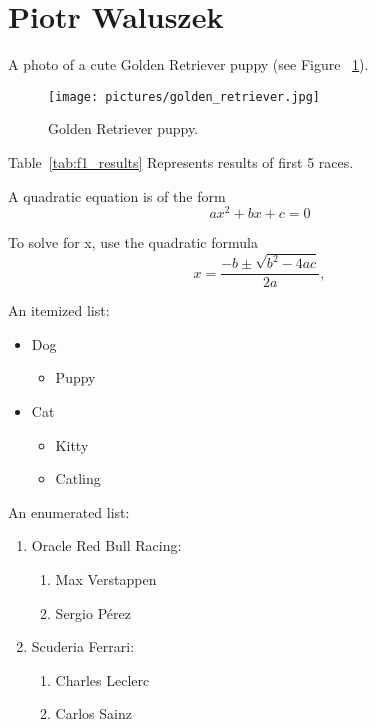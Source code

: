 \section{Piotr Waluszek}
\label{sec:piotrwalu}

A photo of a cute Golden Retriever puppy (see Figure ~\ref{fig:puppy}).

\begin{figure}[htbp]
    \centering
    \texttt{[image: pictures/golden\_retriever.jpg]}
    \caption{Golden Retriever puppy.}
    \label{fig:puppy}
\end{figure}

Table~\ref{tab:f1_results} Represents results of first 5 races.



A quadratic equation is of the form \[ax^2 + bx + c =0 \]

To solve for x, use the quadratic formula $$x = \frac {-b \pm \sqrt{b^2 -4ac}} {2a},$$ 

 An itemized list:
\begin{itemize}
   \item Dog
      \begin{itemize}
     \item Puppy
    \end{itemize}
   \item Cat
   \begin{itemize}
     \item Kitty
     \item Catling
    \end{itemize}
\end{itemize}


An enumerated list:
\begin{enumerate}
   \item Oracle Red Bull Racing:
   \begin{enumerate}
     \item Max Verstappen
     \item Sergio Pérez
   \end{enumerate}
   \item Scuderia Ferrari:
   \begin{enumerate}
     \item Charles Leclerc
     \item Carlos Sainz
   \end{enumerate}
\end{enumerate}

\vspace{0.6cm}

